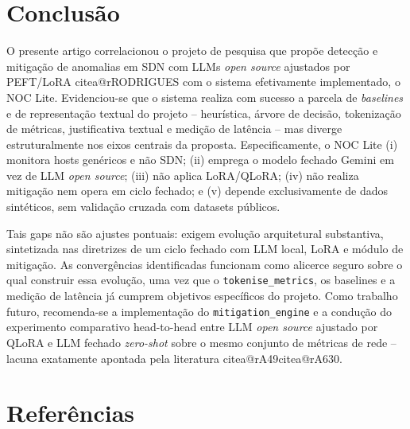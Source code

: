 \documentclass[12pt,a4paper]{article}
\makeatletter
\newcommand{\citea}[1]{\begingroup\edef\@currentlabel{\csname citea@#1\endcsname}\@currentlabel\endgroup}
\makeatother
\begin{document}
\section{Conclusão}
\label{sec:conclusao}

O presente artigo correlacionou o projeto de pesquisa que propõe detecção e
mitigação de anomalias em SDN com LLMs \textit{open source} ajustados por
PEFT/LoRA \citea{rRODRIGUES} com o sistema efetivamente implementado, o NOC Lite.
Evidenciou-se que o sistema realiza com sucesso a parcela de \textit{
baselines} e de representação textual do projeto -- heurística, árvore de
decisão, tokenização de métricas, justificativa textual e medição de latência
-- mas diverge estruturalmente nos eixos centrais da proposta. Especificamente,
o NOC Lite (i) monitora hosts genéricos e não SDN; (ii) emprega o modelo
fechado Gemini em vez de LLM \textit{open source}; (iii) não aplica LoRA/QLoRA;
(iv) não realiza mitigação nem opera em ciclo fechado; e (v) depende
exclusivamente de dados sintéticos, sem validação cruzada com datasets
públicos.

Tais gaps não são ajustes pontuais: exigem evolução arquitetural substantiva,
sintetizada nas diretrizes de um ciclo fechado com LLM local, LoRA e módulo de
mitigação. As convergências identificadas funcionam como alicerce seguro sobre
o qual construir essa evolução, uma vez que o \texttt{tokenise\_metrics}, os
baselines e a medição de latência já cumprem objetivos específicos do projeto.
Como trabalho futuro, recomenda-se a implementação do \texttt{mitigation\_engine}
e a condução do experimento comparativo head-to-head entre LLM \textit{open
source} ajustado por QLoRA e LLM fechado \textit{zero-shot} sobre o mesmo
conjunto de métricas de rede -- lacuna exatamente apontada pela literatura
\citea{rA49}\citea{rA630}.

\section*{Referências}

\end{document}
